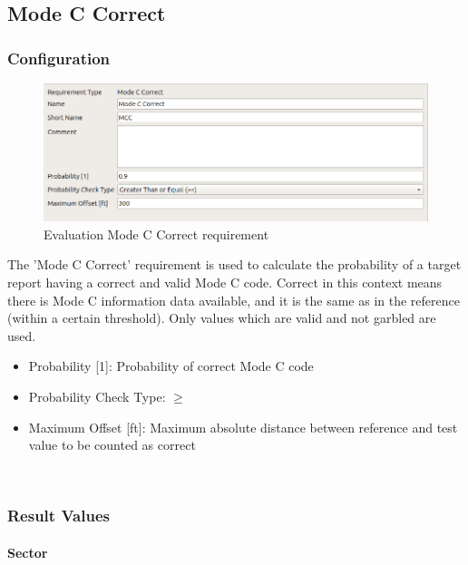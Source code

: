 \subsection{Mode C Correct}
\label{sec:eval_req_mc_correct} 

\subsubsection{Configuration}

\begin{figure}[H]
    \includegraphics[width=14cm,frame]{figures/eval_req_mc_correct.png}
  \caption{Evaluation Mode C Correct requirement}
\end{figure}

The 'Mode C Correct' requirement is used to calculate the probability of a target report having a correct and valid Mode C code. 
Correct in this context means there is Mode C information data available, and it is the same as in the reference (within a certain threshold). Only values which are valid and not garbled are used. \\

\begin{itemize}  
\item Probability [1]: Probability of correct Mode C code
\item Probability Check Type: $\geq$
\item Maximum Offset [ft]: Maximum absolute distance between reference and test value to be counted as correct
\end{itemize}
\ \\

\subsubsection{Result Values}

\paragraph{Sector}

